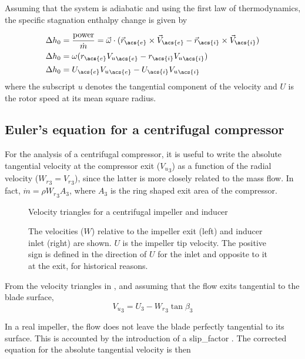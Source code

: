 Assuming that the system is adiabatic and using the first law of thermodynamics, the specific stagnation enthalpy change is given by

\begin{align}
    \Delta h_0 &= \frac{\text{power}}{\dot{m}} 
             = \vec{\omega} \cdot (\vec{r}_{\acs{e}}\cross\vec{V}_{\acs{e}} - \vec{r}_{\acs{i}}\cross\vec{V}_{\acs{i}}) \\
    \Delta h_0 &= \omega (r_{\acs{e}} {V_u}_{\acs{e}} - r_{\acs{i}} {V_u}_{\acs{i}}) \\
    \Delta h_0 &= U_{\acs{e}} {V_u}_{\acs{e}} - U_{\acs{i}} {V_u}_{\acs{i}} 
    \label{eqn:euler}
\end{align}
where the subscript $u$ denotes the tangential component of the velocity and $U$ is the rotor speed at its mean square radius.

\subsection{Euler's equation for a centrifugal compressor}

For the analysis of a centrifugal compressor, 
it is useful to write the absolute tangential velocity at the compressor exit (${V_u}_3$)
as a function of the radial velocity (${W_r}_3={V_r}_3$),
since the latter is more closely related to the mass flow. 
In fact, $\dot{m} = \rho {W_r}_3 A_3$, where $A_3$ is the ring shaped exit area of the compressor.

\begin{figure}[bp]
    \caption{Velocity triangles for a centrifugal impeller and inducer}
    \label{fig:compressor_schematic}
    
    \source{\authorsfigure}
    \caption*{The velocities ($W$) relative to the impeller exit (left) and inducer inlet (right) are shown. $U$ is the impeller tip velocity. The positive sign is defined in the direction of $U$ for the inlet and opposite to it at the exit, for historical reasons.}
\end{figure}

From the velocity triangles in , 
and assuming that the flow exits tangential to the blade surface,
\begin{equation}
    \label{eqn:V_u_3}
    {V_u}_3 = U_3 - {W_r}_3 \tan\beta_3
\end{equation}

In a real impeller, the flow does not leave the blade perfectly tangential to its surface. 
This is accounted by the introduction of a \acf{slip_factor} \cite{Wiesner1967,Aungier1995}.
The corrected equation for the absolute tangential velocity is then


